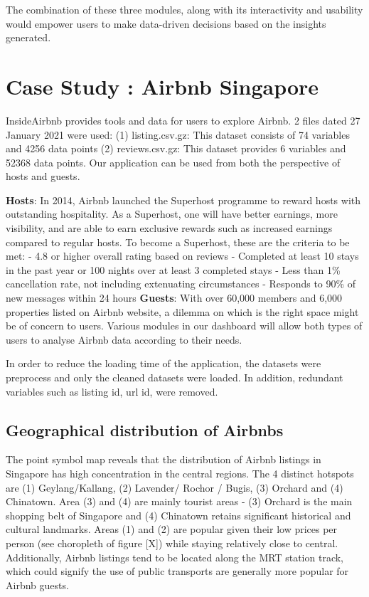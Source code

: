 \documentclass{acm_proc_article-sp}
\begin{document}
The combination of these three modules, along with its interactivity and
usability would empower users to make data-driven decisions based on the
insights generated.

\hypertarget{case-study-airbnb-singapore}{%
\section{Case Study : Airbnb
Singapore}\label{case-study-airbnb-singapore}}

InsideAirbnb provides tools and data for users to explore Airbnb. 2
files dated 27 January 2021 were used: (1) listing.csv.gz: This dataset
consists of 74 variables and 4256 data points (2) reviews.csv.gz: This
dataset provides 6 variables and 52368 data points. Our application can
be used from both the perspective of hosts and guests.

\textbf{Hosts}: In 2014, Airbnb launched the Superhost programme to
reward hosts with outstanding hospitality. As a Superhost, one will have
better earnings, more visibility, and are able to earn exclusive rewards
such as increased earnings compared to regular hosts. To become a
Superhost, these are the criteria to be met: - 4.8 or higher overall
rating based on reviews - Completed at least 10 stays in the past year
or 100 nights over at least 3 completed stays - Less than 1\%
cancellation rate, not including extenuating circumstances - Responds to
90\% of new messages within 24 hours \textbf{Guests}: With over 60,000
members and 6,000 properties listed on Airbnb website, a dilemma on
which is the right space might be of concern to users. Various modules
in our dashboard will allow both types of users to analyse Airbnb data
according to their needs.

In order to reduce the loading time of the application, the datasets
were preprocess and only the cleaned datasets were loaded. In addition,
redundant variables such as listing id, url id, were removed.

\hypertarget{geographical-distribution-of-airbnbs}{%
\subsection{Geographical distribution of
Airbnbs}\label{geographical-distribution-of-airbnbs}}

The point symbol map reveals that the distribution of Airbnb listings in
Singapore has high concentration in the central regions. The 4 distinct
hotspots are (1) Geylang/Kallang, (2) Lavender/ Rochor / Bugis, (3)
Orchard and (4) Chinatown. Area (3) and (4) are mainly tourist areas -
(3) Orchard is the main shopping belt of Singapore and (4) Chinatown
retains significant historical and cultural landmarks. Areas (1) and (2)
are popular given their low prices per person (see choropleth of figure
{[}X{]}) while staying relatively close to central. Additionally, Airbnb
listings tend to be located along the MRT station track, which could
signify the use of public transports are generally more popular for
Airbnb guests.
\end{document}
